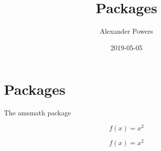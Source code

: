 \documentclass{article}
\title{Packages}
\author{Alexander Powers}
\date{2019-05-05}
\begin{document}
\maketitle

\section{Packages}
The amsmath package

\begin{equation}
f(x) = x^2
\end{equation}

\begin{equation*}
f(x) = x^2
\end{equation*}
\end{document}
